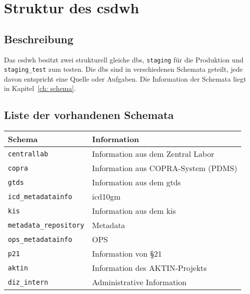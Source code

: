  \chapter{Struktur des \acs{csdwh}} \label{ch:strcsdwh} 
 
    \section{Beschreibung}
    
    Das \ac{csdwh} besitzt zwei strukturell gleiche \acp{db}, \texttt{staging} für die Produktion und \texttt{staging\_test} zum testen. Die \acp{db} sind in verschiedenen Schemata geteilt, jede davon entspricht eine Quelle oder Aufgaben. Die Information der Schemata liegt in Kapitel~\ref{ch: schema}.
    
    \section{Liste der vorhandenen Schemata}
    
    \begin{center}
    	\begin{tabular}{|| l | p{8cm} ||} 
    		\hline
    		Schema & Information \\ 
    		\hline\hline
    		\texttt{centrallab} & Information aus dem Zentral Labor \\ 
    		\hline
    		\texttt{copra} & Information aus COPRA-System (PDMS) \\
    		\hline
    		\texttt{gtds} & Information aus dem \ac{gtds}  \\
    		\hline
    		\texttt{icd\_metadatainfo} & \ac{icd10gm}  \\
    		\hline
    		\texttt{kis} & Information aus dem \ac{kis}  \\
    		\hline
        	\texttt{metadata\_repository} & Metadata \\
        	\hline 
        	\texttt{ops\_metadatainfo} & OPS  \\
        	\hline
        	\texttt{p21} & Information von \S 21  \\ 
        	\hline
        	\texttt{aktin} & Information des AKTIN-Projekts\\
        	\hline
        	\texttt{diz\_intern} & Administrative Information\\
        	\hline
    	\end{tabular}
    \end{center}
